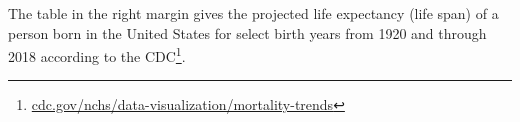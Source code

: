 

\geometry{
    margin=0.67in%
}
\usepackage{fourier}
\usepackage[default]{comicneue}



\usepackage{pagegrid}




The table in the right margin gives the projected life expectancy (life span)
of a person born in the United States for select birth years
from 1920 and through 2018 according to the 
CDC\footnote{\href{https://www.cdc.gov/nchs/data-visualization/mortality-trends/}{cdc.gov/nchs/data-visualization/mortality-trends}}.

\vspace{-1em}

